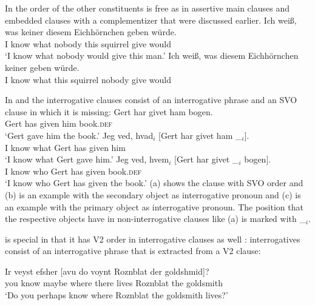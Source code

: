 In  the order of the other constituents is free as in assertive main clauses and embedded
clauses with a complementizer that were discussed earlier. 
\eal
\ex
\gll Ich weiß, was keiner diesem Eichhörnchen geben würde.\\
     I know    what nobody this squirrel give would\\
\glt `I know what nobody would give this man.'
\ex 
\gll Ich weiß, was diesem Eichhörnchen keiner geben würde.\\
     I know what this squirrel nobody give would\\
\zl

In  and  the interrogative clauses consist of an interrogative phrase and an SVO clause
in which it is missing:
\eal
\ex 
\gll Gert har givet ham bogen.\\
     Gert has given him book.\textsc{def}\\
\glt `Gert gave him the book.'
\ex
\gll Jeg ved, hvad$_i$ [Gert har givet ham \_$_i$].\\
     I know what \spacebr{}Gert has given him\\
\glt `I know what Gert gave him.'
\ex
\gll Jeg ved, hvem$_i$ [Gert har givet \_$_i$   bogen].\\
     I know who        \spacebr{}Gert has given {} book.\textsc{def}\\
\glt `I know who Gert has given the book.'
\zl
(a) shows the clause with SVO order and (b) is an example with the secondary object as
interrogative pronoun and (c) is an example with the primary object as interrogative
pronoun. The position that the respective objects have in non-interrogative clauses like (a)
is marked with \_$_i$.

 is special in that it has V2 order in interrogative clauses as well \citep[Sections~4.1, 4.2]{Diesing90a}: interrogatives
consist of an interrogative phrase that is extracted from a V2 clause:

\ea
\gll Ir veyst efsher [avu            do    voynt Roznblat   der goldshmid]?\footnotemark\\
     you know maybe  \spacebr{}where there lives Roznblat the goldsmith\\
\glt `Do you perhaps know where Roznblat the goldsmith lives?' 
\z
%

